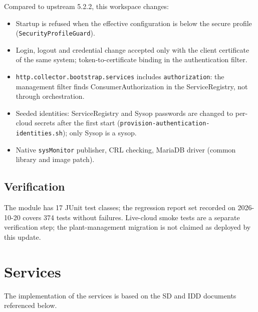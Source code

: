 \documentclass[a4paper]{arrowhead}
\begin{document}
Compared to upstream 5.2.2, this workspace changes:
\begin{itemize}
  \item Startup is refused when the effective configuration is below the secure profile (\texttt{Security\allowbreak{}Profile\allowbreak{}Guard}).
  \item Login, logout and credential change accepted only with the client certificate of the same system; token-to-certificate binding in the authentication filter.
  \item \texttt{http.\allowbreak{}collector.\allowbreak{}bootstrap.\allowbreak{}services} includes \texttt{authorization}: the management filter finds Consumer\allowbreak{}Authorization in the ServiceRegistry, not through orchestration.
  \item Seeded identities: ServiceRegistry and Sysop passwords are changed to per-cloud secrets after the first start (\texttt{provision-\allowbreak{}authentication-\allowbreak{}identities.\allowbreak{}sh}); only Sysop is a sysop.
  \item Native \texttt{sysMonitor} publisher, CRL checking, MariaDB driver (common library and image patch).
\end{itemize}

\subsection{Verification}

The module has 17 JUnit test classes; the regression report set recorded on 2026-10-20 covers 374 tests without failures. Live-cloud smoke tests are a separate verification step; the plant-management migration is not claimed as deployed by this update.

\newpage

\section{Services}
\label{sec:services}

The implementation of the services is based on the SD and IDD documents referenced below.
\end{document}
